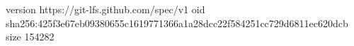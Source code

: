 version https://git-lfs.github.com/spec/v1
oid sha256:425f3e67eb09380655c1619771366a1a28dcc22f584251cc729d6811ec620dcb
size 154282
